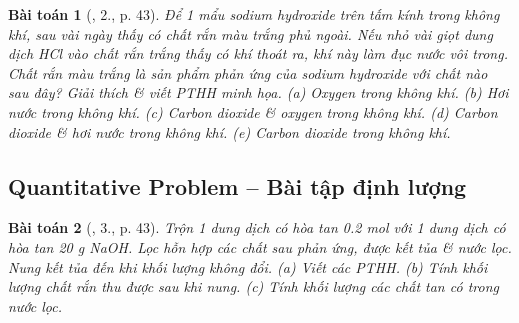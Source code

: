 \documentclass{article}
\newtheorem{baitoan}{Bài toán}
\begin{document}
\begin{baitoan}[\cite{SGK_Hoa_Hoc_9}, 2., p. 43]
	Để 1 mẩu sodium hydroxide trên tấm kính trong không khí, sau vài ngày thấy có chất rắn màu trắng phủ ngoài. Nếu nhỏ vài giọt dung dịch \emph{HCl} vào chất rắn trắng thấy có khí thoát ra, khí này làm đục nước vôi trong. Chất rắn màu trắng là sản phẩm phản ứng của sodium hydroxide với chất nào sau đây? Giải thích \& viết PTHH minh họa. (a) Oxygen trong không khí. (b) Hơi nước trong không khí. (c) Carbon dioxide \& oxygen trong không khí. (d) Carbon dioxide \& hơi nước trong không khí. (e) Carbon dioxide trong không khí.
\end{baitoan}

\subsection{Quantitative Problem -- Bài tập định lượng}

\begin{baitoan}[\cite{SGK_Hoa_Hoc_9}, 3., p. 43]
	Trộn 1 dung dịch có hòa tan \emph{0.2 mol } với 1 dung dịch có hòa tan \emph{20 g NaOH}. Lọc hỗn hợp các chất sau phản ứng, được kết tủa \& nước lọc. Nung kết tủa đến khi khối lượng không đổi. (a) Viết các PTHH. (b) Tính khối lượng chất rắn thu được sau khi nung. (c) Tính khối lượng các chất tan có trong nước lọc.
\end{baitoan}


\printbibliography[heading=bibintoc]
	
\end{document}
